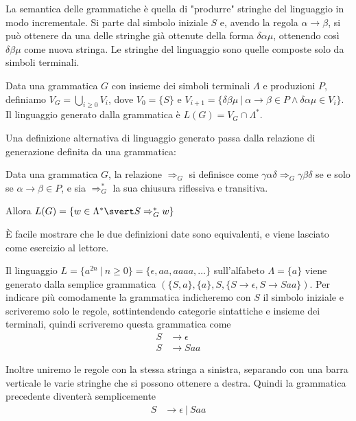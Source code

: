\documentclass[12pt]{article}
\numberwithin{theorem}{subsection}
\begin{document}
La semantica delle grammatiche è quella di "produrre" stringhe del linguaggio in modo incrementale. Si parte dal simbolo iniziale $S$ e, avendo la regola $\alpha \rightarrow \beta$, si può ottenere da una delle stringhe già ottenute della forma $\delta\alpha\mu$, ottenendo così $\delta\beta\mu$ come nuova stringa. Le stringhe del linguaggio sono quelle composte solo da simboli terminali.

\begin{definition}
	Data una grammatica $G$ con insieme dei simboli terminali $\Lambda$ e produzioni $P$, definiamo $V_G = \bigcup\limits_{i \ge 0} V_i$, dove $V_0 = \{ S \}$ e $V_{i+1} = \{ \delta\beta\mu \ \vert \ \alpha \rightarrow \beta \in P \land \delta\alpha\mu \in V_i \}$. Il linguaggio generato dalla grammatica è $L(G) = V_G \cap \Lambda^*$.
\end{definition}

Una definizione alternativa di linguaggio generato passa dalla relazione di generazione definita da una grammatica:
\begin{definition}
	Data una grammatica $G$, la relazione $\Rightarrow_G$ si definisce come $\gamma\alpha\delta \Rightarrow_G \gamma\beta\delta$ se e solo se $\alpha \rightarrow \beta \in P$, e sia $\Rightarrow_G^*$  la sua chiusura riflessiva e transitiva.
	
	Allora $L(G) = \lbrace w \in \Lambda^* \svert S \Rightarrow_G^* w \rbrace$
\end{definition}

È facile mostrare che le due definizioni date sono equivalenti, e viene lasciato come esercizio al lettore.

\begin{example}
	Il linguaggio $L=\{ a^{2n} \ \vert \ n \ge 0 \} = \{ \epsilon, aa, aaaa, \dots \}$ sull'alfabeto $\Lambda = \{ a \}$ viene generato dalla semplice grammatica $(\{ S, a\}, \{ a \}, S, \{ S \rightarrow \epsilon, S \rightarrow Saa \})$. Per indicare più comodamente la grammatica indicheremo con $S$ il simbolo iniziale e scriveremo solo le regole, sottintendendo categorie sintattiche e insieme dei terminali, quindi scriveremo questa grammatica come
	\begin{align*}
		S &\rightarrow \epsilon \\
		S &\rightarrow Saa
	\end{align*}
	
	Inoltre uniremo le regole con la stessa stringa a sinistra, separando con una barra verticale le varie stringhe che si possono ottenere a destra. Quindi la grammatica precedente diventerà semplicemente
	\begin{align*}
		S &\rightarrow \epsilon \ \vert \ Saa
	\end{align*}
\end{example}
\end{document}
